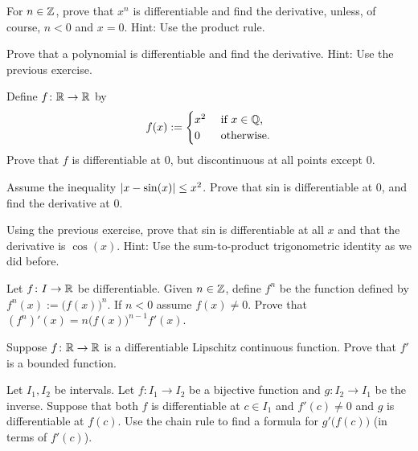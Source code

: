 \begin{exercise} \label{exercise:diffofxn}
For $n \in {\mathbb{Z}}$,
prove that $x^n$ is differentiable and find the derivative,
unless, of course, $n < 0$ and $x=0$.
Hint: Use the product rule.
\end{exercise}

\begin{exercise}
Prove that a polynomial is differentiable and find the derivative.
Hint: Use the previous exercise.
\end{exercise}

\begin{exercise}
Define $f \colon {\mathbb{R}} \to {\mathbb{R}}$ by
\begin{equation*}
f(x) :=
\begin{cases}
x^2 & \text{ if $x \in {\mathbb{Q}}$,}\\
0 & \text{ otherwise.}
\end{cases}
\end{equation*}
Prove that $f$ is differentiable at $0$, but discontinuous at all points
except $0$.
\end{exercise}

\begin{exercise}
Assume the inequality $\left\lvert {x-\sin(x)} \right\rvert \leq x^2$.  Prove that sin is
differentiable at $0$, and find the derivative at $0$.
\end{exercise}

\begin{exercise}
Using the previous exercise, prove that sin is differentiable at all $x$
and that the derivative is $\cos(x)$.  Hint: Use the sum-to-product
trigonometric identity as we did before.
\end{exercise}

\begin{exercise}
Let $f \colon I \to {\mathbb{R}}$ be differentiable.  Given $n \in {\mathbb{Z}}$, define $f^n$
be the function defined by $f^n(x) := {\bigl( f(x) \bigr)}^n$.  If
$n < 0$ assume $f(x) \not= 0$.  Prove that
$(f^n)'(x) = n {\bigl(f(x) \bigr)}^{n-1} f'(x)$.
\end{exercise}

\begin{exercise}
Suppose $f \colon {\mathbb{R}} \to {\mathbb{R}}$ is a differentiable
Lipschitz continuous function.
Prove that $f'$ is a bounded function.
\end{exercise}

\begin{exercise}
Let $I_1, I_2$ be intervals.
Let $f \colon I_1 \to I_2$ be a bijective function and $g \colon I_2 \to I_1$
be the inverse.  Suppose that both $f$ is differentiable at $c \in I_1$ and
$f'(c) \not=0$ and $g$ is differentiable at $f(c)$.  Use the chain rule
to find a formula for $g'\bigl(f(c)\bigr)$ (in terms of $f'(c)$).
\end{exercise}

